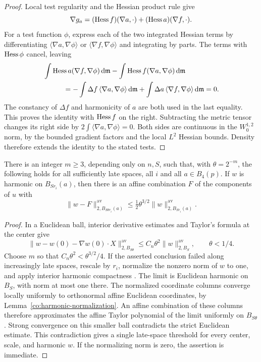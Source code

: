 \begin{proof}
Local test regularity and the Hessian product rule give
\[
 \nabla g_a=(\operatorname{Hess} f)(\nabla a,\cdot)
             +(\operatorname{Hess} a)(\nabla f,\cdot).
\]
For a test function $\phi$, express each of the two integrated
Hessian terms by differentiating
$\langle\nabla a,\nabla\phi\rangle$ or
$\langle\nabla f,\nabla\phi\rangle$ and integrating by parts.
The terms with $\operatorname{Hess}\phi$ cancel, leaving
\begin{align*}
 &\int\operatorname{Hess} a(\nabla f,\nabla\phi)\,\mathrm d\mathfrak m
  -\int\operatorname{Hess} f(\nabla a,\nabla\phi)\,\mathrm d\mathfrak m\\
 &\hspace{1cm}
 =-\int\Delta f\,\langle\nabla a,\nabla\phi\rangle\,\mathrm d\mathfrak m
   +\int\Delta a\,\langle\nabla f,\nabla\phi\rangle\,\mathrm d\mathfrak m
 =0.
\end{align*}
The constancy of $\Delta f$ and harmonicity of $a$ are both used
in the last equality.  This proves the identity with $\operatorname{Hess} f$
on the right.  Subtracting the metric tensor changes its right
side by $2\int\langle\nabla a,\nabla\phi\rangle=0$.
Both sides are continuous in the $W^{1,2}_0$ norm, by the bounded
gradient factors and the local $L^2$ Hessian bounds.  Density
therefore extends the identity to the stated tests.
\end{proof}

\begin{lemma}
\label{pi:affine-improvement}
There is an integer $m\ge3$, depending only on $n,S$, such that,
with $\theta=2^{-m}$, the following holds for all sufficiently
late spaces, all $i$ and all $a\in B_4(p)$.  If $w$ is harmonic
on $B_{Sr_i}(a)$, then there is an affine combination $F$ of the
components of $u$ with
\begin{equation}
 \|w-F\|_{2,B_{S\theta r_i}(a)}^{\mathrm{av}}
 \le\tfrac12\theta^{3/2}
       \|w\|_{2,B_{Sr_i}(a)}^{\mathrm{av}}.
 \label{pi:affine-improvement-equation}
\end{equation}
\end{lemma}

\begin{proof}
In a Euclidean ball, interior derivative estimates and Taylor's
formula at the center give
\[
 \|w-w(0)-\nabla w(0)\cdot X\|_{2,B_{S\theta}}^{\mathrm{av}}
 \le C_n\theta^2\|w\|_{2,B_S}^{\mathrm{av}},
 \qquad \theta<1/4.
\]
Choose $m$ so that $C_n\theta^2<\theta^{3/2}/4$.
If the asserted conclusion failed along increasingly late spaces,
rescale by $r_i$, normalize the nonzero norm of $w$ to one,
and apply interior harmonic compactness \cite{AH18}.  The limit
is Euclidean harmonic on $B_S$, with norm at most one there.
The normalized coordinate columns converge locally uniformly to
orthonormal affine Euclidean coordinates, by
Lemma~\ref{co:harmonic-normalization}.  An affine combination
of these columns therefore approximates the affine Taylor
polynomial of the limit uniformly on $B_{S\theta}$.
Strong convergence on this smaller ball contradicts the strict
Euclidean estimate.  This contradiction gives a single late-space
threshold for every center, scale, and harmonic $w$.  If the
normalizing norm is zero, the assertion is immediate.
\end{proof}

